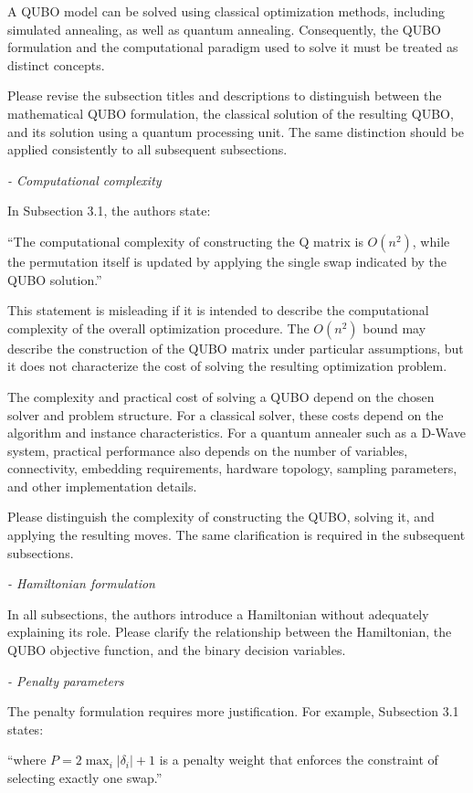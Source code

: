 \documentclass[12pt]{article}
\begin{document}
A QUBO model can be solved using classical optimization methods, including simulated annealing, as well as quantum annealing. Consequently, the QUBO formulation and the computational paradigm used to solve it must be treated as distinct concepts.

Please revise the subsection titles and descriptions to distinguish between the mathematical QUBO formulation, the classical solution of the resulting QUBO, and its solution using a quantum processing unit. The same distinction should be applied consistently to all subsequent subsections.

\emph{- Computational complexity}

In Subsection 3.1, the authors state:

``The computational complexity of constructing the Q matrix is $O(n^2)$, while the permutation itself is updated by applying the single swap indicated by the QUBO solution.''

This statement is misleading if it is intended to describe the computational complexity of the overall optimization procedure. The $O(n^2)$ bound may describe the construction of the QUBO matrix under particular assumptions, but it does not characterize the cost of solving the resulting optimization problem.

The complexity and practical cost of solving a QUBO depend on the chosen solver and problem structure. For a classical solver, these costs depend on the algorithm and instance characteristics. For a quantum annealer such as a D-Wave system, practical performance also depends on the number of variables, connectivity, embedding requirements, hardware topology, sampling parameters, and other implementation details.

Please distinguish the complexity of constructing the QUBO, solving it, and applying the resulting moves. The same clarification is required in the subsequent subsections.

\emph{- Hamiltonian formulation}

In all subsections, the authors introduce a Hamiltonian without adequately explaining its role. Please clarify the relationship between the Hamiltonian, the QUBO objective function, and the binary decision variables.

\emph{- Penalty parameters}

The penalty formulation requires more justification. For example, Subsection 3.1 states:

``where $P=2\max_i|\delta_i|+1$ is a penalty weight that enforces the constraint of selecting exactly one swap.''
\end{document}
